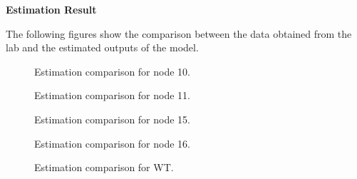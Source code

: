 \textbf{Estimation Result}


The following figures show the comparison between the data obtained from the lab and the estimated outputs of the model.  

\begin{figure}[H]
  \centering
  \begin{minipage}[b]{0.45\textwidth}
     
    \caption{Estimation comparison for node 10.}
  \end{minipage}
  \hfill
  \begin{minipage}[b]{0.45\textwidth}
     
    \caption{Estimation comparison for node 11.}
  \end{minipage}
\end{figure}

\begin{figure}[H]
  \centering
  \begin{minipage}[b]{0.45\textwidth}
     
    \caption{Estimation comparison for node 15.}
  \end{minipage}
  \hfill
  \begin{minipage}[b]{0.45\textwidth}
     
    \caption{Estimation comparison for node 16.}
  \end{minipage}
\end{figure}

\begin{figure}[H]
 \centering
     
    \caption{Estimation comparison for WT.}
\end{figure}
